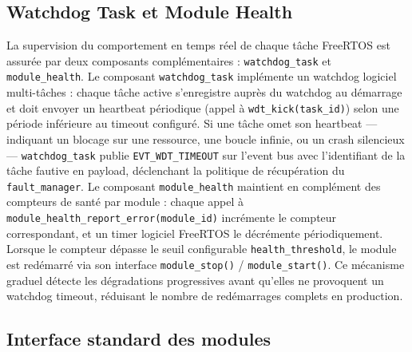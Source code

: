 \subsection{Watchdog Task et Module Health}
\label{subsec:timers}

La supervision du comportement en temps réel de chaque tâche FreeRTOS
est assurée par deux composants complémentaires : \texttt{watchdog\_task}
et \texttt{module\_health}. Le composant \texttt{watchdog\_task}
implémente un watchdog logiciel multi-tâches : chaque tâche active
s'enregistre auprès du watchdog au démarrage et doit envoyer un
heartbeat périodique (appel à \texttt{wdt\_kick(task\_id)}) selon
une période inférieure au timeout configuré. Si une tâche omet son
heartbeat — indiquant un blocage sur une ressource, une boucle
infinie, ou un crash silencieux — \texttt{watchdog\_task} publie
\texttt{EVT\_WDT\_TIMEOUT} sur l'event bus avec l'identifiant de la
tâche fautive en payload, déclenchant la politique de récupération
du \texttt{fault\_manager}. Le composant \texttt{module\_health}
maintient en complément des compteurs de santé par module :
chaque appel à \texttt{module\_health\_report\_error(module\_id)}
incrémente le compteur correspondant, et un timer logiciel FreeRTOS
le décrémente périodiquement. Lorsque le compteur dépasse le seuil
configurable \texttt{health\_threshold}, le module est redémarré
via son interface \texttt{module\_stop()} / \texttt{module\_start()}.
Ce mécanisme graduel détecte les dégradations progressives avant
qu'elles ne provoquent un watchdog timeout, réduisant le nombre
de redémarrages complets en production.

\subsection{Interface standard des modules}
\label{subsec:module_iface}

